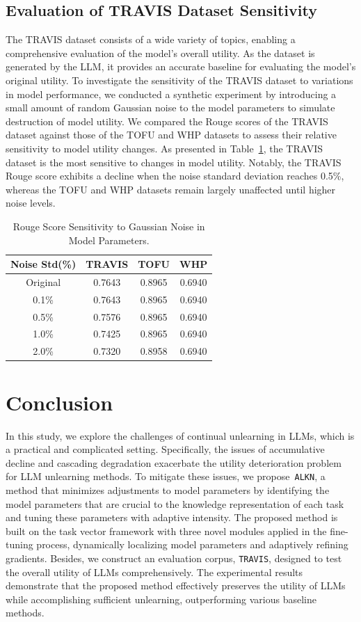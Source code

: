\documentclass{article}
\theoremstyle{plain}
\theoremstyle{definition}
\theoremstyle{remark}
\newcommand{\method}{\texttt{ALKN}}
\begin{document}
\subsection{Evaluation of TRAVIS Dataset Sensitivity}
The TRAVIS dataset consists of a wide variety of topics, enabling a comprehensive evaluation of the model’s overall utility. As the dataset is generated by the LLM, it provides an accurate baseline for evaluating the model's original utility. To investigate the sensitivity of the TRAVIS dataset to variations in model performance, we conducted a synthetic experiment by introducing a small amount of random Gaussian noise to the model parameters to simulate destruction of model utility. We compared the Rouge scores of the TRAVIS dataset against those of the TOFU and WHP datasets to assess their relative sensitivity to model utility changes. As presented in Table~\ref{tab:travis_sensitivity}, the TRAVIS dataset is the most sensitive to changes in model utility. Notably, the TRAVIS Rouge score exhibits a decline when the noise standard deviation reaches 0.5\%, whereas the TOFU and WHP datasets remain largely unaffected until higher noise levels.

\begin{table}[t]
\centering
\caption{Rouge Score Sensitivity to Gaussian Noise in Model Parameters.}
\label{tab:travis_sensitivity}
\begin{tabular}{c|c|c|c}
\toprule
Noise Std(\%) & TRAVIS & TOFU & WHP \\
\midrule
\rowcolor{gray!20} Original   & 0.7643 & 0.8965 & 0.6940 \\
\hline
0.1\% & 0.7643 & 0.8965 & 0.6940 \\
0.5\% & 0.7576 & 0.8965 & 0.6940 \\
1.0\%   & 0.7425 & 0.8965 & 0.6940 \\
2.0\%   & 0.7320 & 0.8958 & 0.6940 \\
\bottomrule
\end{tabular}
\end{table}

\section{Conclusion}
In this study, we explore the challenges of continual unlearning in LLMs, which is a practical and complicated setting. 
Specifically, the issues of accumulative decline and cascading degradation exacerbate the utility deterioration problem for LLM unlearning methods.
To mitigate these issues, we propose~\method, a method that minimizes adjustments to model parameters by identifying the model parameters that are crucial to the knowledge representation of each task and tuning these parameters with adaptive intensity.
The proposed method is built on the task vector framework with three novel modules applied in the fine-tuning process, dynamically localizing model parameters and adaptively refining gradients.
Besides, we construct an evaluation corpus, \texttt{TRAVIS}, designed to test the overall utility of LLMs comprehensively.
The experimental results demonstrate that the proposed method effectively preserves the utility of LLMs while accomplishing sufficient unlearning, outperforming various baseline methods.
\end{document}

